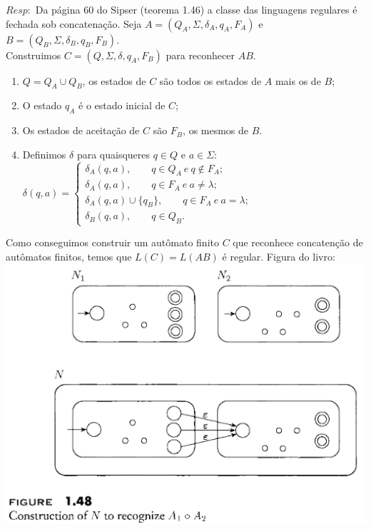 \documentclass{homework}
\begin{document}

	$Resp:$ Da página 60 do Sipser (teorema 1.46) a classe das linguagens regulares é fechada sob concatenação.
	Seja $A =(Q_A,\Sigma,\delta_A,q_A,F_A)$ e $B = (Q_B,\Sigma,\delta_B,q_B,F_B)$.\\
	Construimos $C = (Q,\Sigma,\delta,q_A,F_B)$ para reconhecer $AB$.
	\begin{enumerate}
		\item $Q = Q_A \cup Q_B$, os estados de $C$ são todos os estados de $A$ mais os de $B$;
		\item O estado $q_A$ é o estado inicial de $C$;
		\item Os estados de aceitação de $C$ são $F_B$, os mesmos de $B$. 
		\item Definimos $\delta$ para quaisqueres $q \in Q$ e $a \in \Sigma$:\\
		$\delta(q,a) = \begin{cases}
							\delta_A(q,a),\qquad q \in Q_A \ e \ q \notin F_A;\\
							\delta_A(q,a),\qquad q \in F_A \ e \ a \neq \lambda;\\
							\delta_A(q,a) \cup \{q_B\},\qquad q \in F_A \ e \ a = \lambda;\\
							\delta_B(q,a), \qquad  q \in Q_B.
					   \end{cases}					  
		$
	\end{enumerate}
	Como conseguimos construir um autômato finito $C$ que reconhece concatenção de autômatos finitos, temos que $L(C) = L(AB)$ é regular.
	Figura do livro:\\
	\includegraphics[scale=.5]{Q5-SipserAutom}
\end{document}
